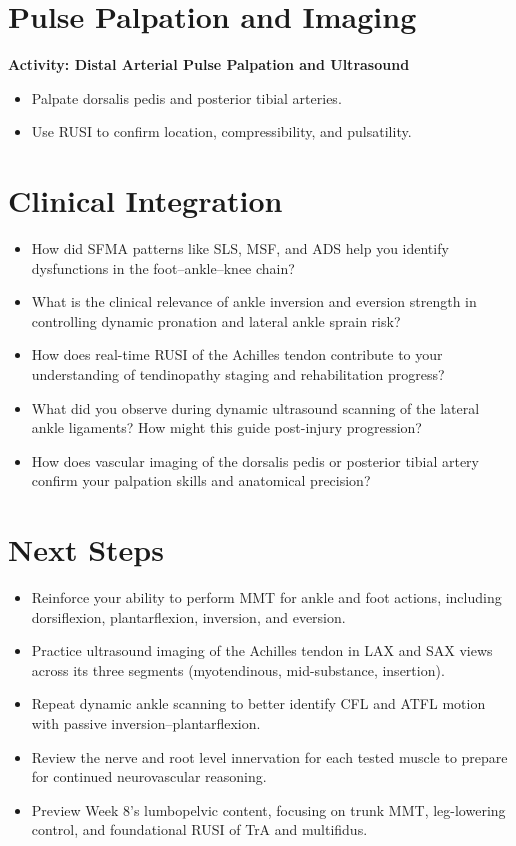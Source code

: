 \section*{Pulse Palpation and Imaging}

\begin{labactivitybox}
\textbf{Activity: Distal Arterial Pulse Palpation and Ultrasound}
\begin{itemize}
  \item Palpate dorsalis pedis and posterior tibial arteries.
  \item Use RUSI to confirm location, compressibility, and pulsatility.
\end{itemize}
\end{labactivitybox}

\section*{Clinical Integration}

\begin{itemize}
  \item How did SFMA patterns like SLS, MSF, and ADS help you identify dysfunctions in the foot–ankle–knee chain?
  \item What is the clinical relevance of ankle inversion and eversion strength in controlling dynamic pronation and lateral ankle sprain risk?
  \item How does real-time RUSI of the Achilles tendon contribute to your understanding of tendinopathy staging and rehabilitation progress?
  \item What did you observe during dynamic ultrasound scanning of the lateral ankle ligaments? How might this guide post-injury progression?
  \item How does vascular imaging of the dorsalis pedis or posterior tibial artery confirm your palpation skills and anatomical precision?
\end{itemize}

\section*{Next Steps}

\begin{itemize}
  \item Reinforce your ability to perform MMT for ankle and foot actions, including dorsiflexion, plantarflexion, inversion, and eversion.
  \item Practice ultrasound imaging of the Achilles tendon in LAX and SAX views across its three segments (myotendinous, mid-substance, insertion).
  \item Repeat dynamic ankle scanning to better identify CFL and ATFL motion with passive inversion–plantarflexion.
  \item Review the nerve and root level innervation for each tested muscle to prepare for continued neurovascular reasoning.
  \item Preview Week 8’s lumbopelvic content, focusing on trunk MMT, leg-lowering control, and foundational RUSI of TrA and multifidus.
\end{itemize}

